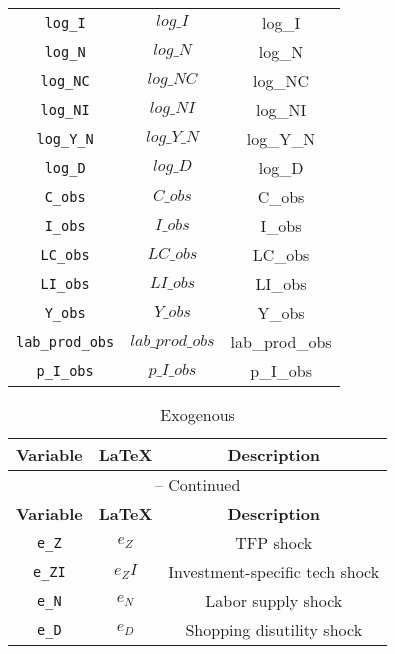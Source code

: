 \begin{center}
\begin{longtable}{ccc}
\texttt{log\_I} & $log\_I$ & log\_I\\
\texttt{log\_N} & $log\_N$ & log\_N\\
\texttt{log\_NC} & $log\_NC$ & log\_NC\\
\texttt{log\_NI} & $log\_NI$ & log\_NI\\
\texttt{log\_Y\_N} & $log\_Y\_N$ & log\_Y\_N\\
\texttt{log\_D} & $log\_D$ & log\_D\\
\texttt{C\_obs} & $C\_obs$ & C\_obs\\
\texttt{I\_obs} & $I\_obs$ & I\_obs\\
\texttt{LC\_obs} & $LC\_obs$ & LC\_obs\\
\texttt{LI\_obs} & $LI\_obs$ & LI\_obs\\
\texttt{Y\_obs} & $Y\_obs$ & Y\_obs\\
\texttt{lab\_prod\_obs} & $lab\_prod\_obs$ & lab\_prod\_obs\\
\texttt{p\_I\_obs} & $p\_I\_obs$ & p\_I\_obs\\
\hline%
\end{longtable}
\end{center}
\begin{center}
\begin{longtable}{ccc}
\caption{Exogenous}\\%
\hline%
\multicolumn{1}{c}{\textbf{Variable}} &
\multicolumn{1}{c}{\textbf{\LaTeX}} &
\multicolumn{1}{c}{\textbf{Description}}\\%
\hline\hline%
\endfirsthead
\multicolumn{3}{c}{{\tablename} \thetable{} -- Continued}\\%
\hline%
\multicolumn{1}{c}{\textbf{Variable}} &
\multicolumn{1}{c}{\textbf{\LaTeX}} &
\multicolumn{1}{c}{\textbf{Description}}\\%
\hline\hline%
\endhead
\texttt{e\_Z} & ${e_Z}$ & TFP shock\\
\texttt{e\_ZI} & ${e_ZI}$ & Investment-specific tech shock\\
\texttt{e\_N} & ${e_N}$ & Labor supply shock\\
\texttt{e\_D} & ${e_D}$ & Shopping disutility shock\\
\hline%
\end{longtable}
\end{center}
